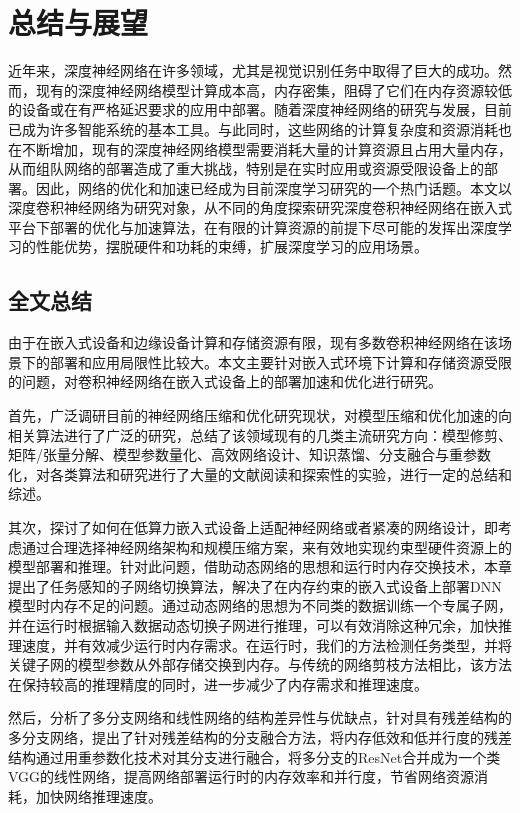 
\chapter{总结与展望}

近年来，深度神经网络在许多领域，尤其是视觉识别任务中取得了巨大的成功。然而，现有的深度神经网络模型计算成本高，内存密集，阻碍了它们在内存资源较低的设备或在有严格延迟要求的应用中部署。随着深度神经网络的研究与发展，目前已成为许多智能系统的基本工具。与此同时，这些网络的计算复杂度和资源消耗也在不断增加，现有的深度神经网络模型需要消耗大量的计算资源且占用大量内存，从而组队网络的部署造成了重大挑战，特别是在实时应用或资源受限设备上的部署。因此，网络的优化和加速已经成为目前深度学习研究的一个热门话题。本文以深度卷积神经网络为研究对象，从不同的角度探索研究深度卷积神经网络在嵌入式平台下部署的优化与加速算法，在有限的计算资源的前提下尽可能的发挥出深度学习的性能优势，摆脱硬件和功耗的束缚，扩展深度学习的应用场景。

\section{全文总结}

由于在嵌入式设备和边缘设备计算和存储资源有限，现有多数卷积神经网络在该场景下的部署和应用局限性比较大。本文主要针对嵌入式环境下计算和存储资源受限的问题，对卷积神经网络在嵌入式设备上的部署加速和优化进行研究。

首先，广泛调研目前的神经网络压缩和优化研究现状，对模型压缩和优化加速的向相关算法进行了广泛的研究，总结了该领域现有的几类主流研究方向：模型修剪、矩阵/张量分解、模型参数量化、高效网络设计、知识蒸馏、分支融合与重参数化，对各类算法和研究进行了大量的文献阅读和探索性的实验，进行一定的总结和综述。

其次，探讨了如何在低算力嵌入式设备上适配神经网络或者紧凑的网络设计，即考虑通过合理选择神经网络架构和规模压缩方案，来有效地实现约束型硬件资源上的模型部署和推理。针对此问题，借助动态网络的思想和运行时内存交换技术，本章提出了任务感知的子网络切换算法，解决了在内存约束的嵌入式设备上部署DNN模型时内存不足的问题。通过动态网络的思想为不同类的数据训练一个专属子网，并在运行时根据输入数据动态切换子网进行推理，可以有效消除这种冗余，加快推理速度，并有效减少运行时内存需求。在运行时，我们的方法检测任务类型，并将关键子网的模型参数从外部存储交换到内存。与传统的网络剪枝方法相比，该方法在保持较高的推理精度的同时，进一步减少了内存需求和推理速度。

然后，分析了多分支网络和线性网络的结构差异性与优缺点，针对具有残差结构的多分支网络，提出了针对残差结构的分支融合方法，将内存低效和低并行度的残差结构通过用重参数化技术对其分支进行融合，将多分支的ResNet合并成为一个类VGG的线性网络，提高网络部署运行时的内存效率和并行度，节省网络资源消耗，加快网络推理速度。

